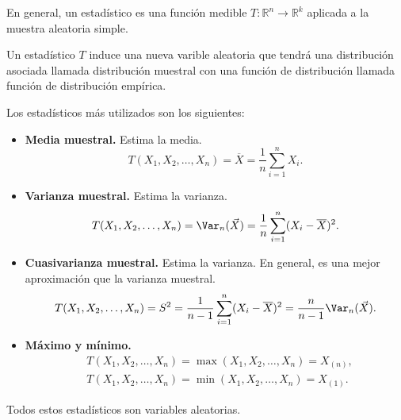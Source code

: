 En general, un estadístico es una función medible $T: \mathbb{R}^n \to \mathbb{R}^k$ aplicada a la muestra aleatoria simple.

Un estadístico $T$ induce una nueva varible aleatoria que tendrá una distribución asociada llamada distribución muestral con una función de distribución llamada función de distribución empírica.

Los estadísticos más utilizados son los siguientes:
\begin{itemize}
    \item \textbf{Media muestral.}
    Estima la media.
    $$T(X_1, X_2, \dots, X_n) = \overline{X} = \frac{1}{n} \sum_{i=1}^n X_i.$$
    
    \item \textbf{Varianza muestral.}
    Estima la varianza.
    $$T(X_1, X_2, \dots, X_n) = \Var_n(\vec{X}) = \frac{1}{n} \sum_{i=1}^n (X_i - \overline{X})^2.$$

    \item \textbf{Cuasivarianza muestral.}
    Estima la varianza.
    En general, es una mejor aproximación que la varianza muestral.
    $$T(X_1, X_2, \dots, X_n) = S^2 = \frac{1}{n-1} \sum_{i=1}^n (X_i - \overline{X})^2 = \frac{n}{n-1} \Var_n(\vec{X}).$$

    \item \textbf{Máximo y mínimo.}
    \begin{align*}
        & T(X_1, X_2, \dots, X_n) = \max(X_1, X_2, \dots, X_n) = X_{(n)}, \\
        & T(X_1, X_2, \dots, X_n) = \min(X_1, X_2, \dots, X_n) = X_{(1)}.
    \end{align*}
\end{itemize}

\begin{note}
    Todos estos estadísticos son variables aleatorias.
\end{note}

